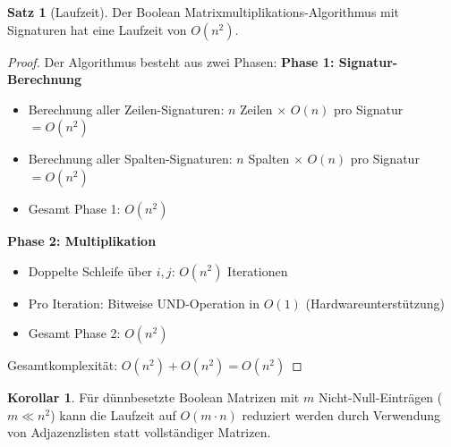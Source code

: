 ﻿\documentclass[a4paper,12pt]{article}
\theoremstyle{definition}
\newtheorem{satz}{Satz}
\newtheorem{korollar}{Korollar}
\begin{document}
\begin{satz}[Laufzeit]
	Der Boolean Matrixmultiplikations-Algorithmus mit Signaturen hat eine Laufzeit von $O(n^2)$.
\end{satz}

\begin{proof}
	Der Algorithmus besteht aus zwei Phasen:\newline	
	\textbf{Phase 1: Signatur-Berechnung}
	\begin{itemize}
		\item[-] Berechnung aller Zeilen-Signaturen: $n$ Zeilen $\times$ $O(n)$ pro Signatur $= O(n^2)$
		\item[-] Berechnung aller Spalten-Signaturen: $n$ Spalten $\times$ $O(n)$ pro Signatur $= O(n^2)$
		\item[-] Gesamt Phase 1: $O(n^2)$
	\end{itemize}
	\textbf{Phase 2: Multiplikation}
	\begin{itemize}
		\item[-] Doppelte Schleife über $i, j$: $O(n^2)$ Iterationen
		\item[-] Pro Iteration: Bitweise UND-Operation in $O(1)$ (Hardwareunterstützung)
		\item[-] Gesamt Phase 2: $O(n^2)$
	\end{itemize}
	
	Gesamtkomplexität: $O(n^2) + O(n^2) = O(n^2)$
\end{proof}

\begin{korollar}
	Für dünnbesetzte Boolean Matrizen mit $m$ Nicht-Null-Einträgen ($m \ll n^2$) kann die Laufzeit auf $O(m \cdot n)$ reduziert werden durch Verwendung von Adjazenzlisten statt vollständiger Matrizen.
\end{korollar}
\end{document}

